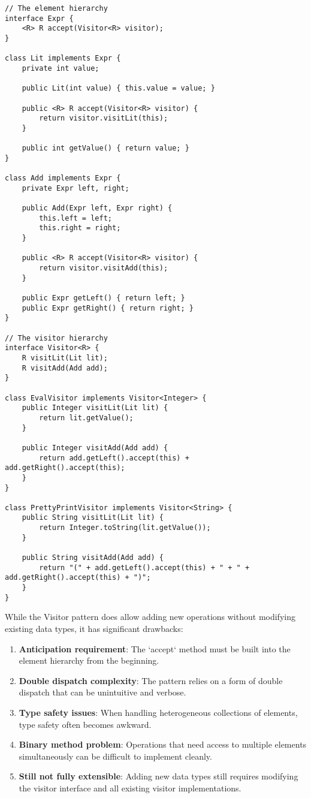 \documentclass[11pt]{article}
\begin{document}
\begin{verbatim}
// The element hierarchy
interface Expr {
    <R> R accept(Visitor<R> visitor);
}

class Lit implements Expr {
    private int value;

    public Lit(int value) { this.value = value; }

    public <R> R accept(Visitor<R> visitor) {
        return visitor.visitLit(this);
    }

    public int getValue() { return value; }
}

class Add implements Expr {
    private Expr left, right;

    public Add(Expr left, Expr right) {
        this.left = left;
        this.right = right;
    }

    public <R> R accept(Visitor<R> visitor) {
        return visitor.visitAdd(this);
    }

    public Expr getLeft() { return left; }
    public Expr getRight() { return right; }
}

// The visitor hierarchy
interface Visitor<R> {
    R visitLit(Lit lit);
    R visitAdd(Add add);
}

class EvalVisitor implements Visitor<Integer> {
    public Integer visitLit(Lit lit) {
        return lit.getValue();
    }

    public Integer visitAdd(Add add) {
        return add.getLeft().accept(this) + add.getRight().accept(this);
    }
}

class PrettyPrintVisitor implements Visitor<String> {
    public String visitLit(Lit lit) {
        return Integer.toString(lit.getValue());
    }

    public String visitAdd(Add add) {
        return "(" + add.getLeft().accept(this) + " + " + add.getRight().accept(this) + ")";
    }
}
\end{verbatim}

While the Visitor pattern does allow adding new operations without modifying existing data types, it has significant drawbacks:

\begin{enumerate}
\item \textbf{Anticipation requirement}: The `accept` method must be built into the element hierarchy from the beginning.
\item \textbf{Double dispatch complexity}: The pattern relies on a form of double dispatch that can be unintuitive and verbose.
\item \textbf{Type safety issues}: When handling heterogeneous collections of elements, type safety often becomes awkward.
\item \textbf{Binary method problem}: Operations that need access to multiple elements simultaneously can be difficult to implement cleanly.
\item \textbf{Still not fully extensible}: Adding new data types still requires modifying the visitor interface and all existing visitor implementations.
\end{enumerate}
\end{document}
